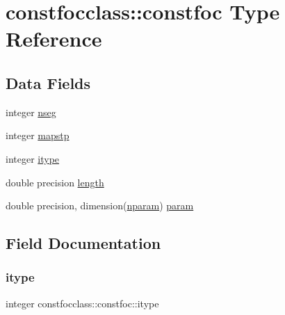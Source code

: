 \hypertarget{structconstfocclass_1_1constfoc}{}\section{constfocclass\+::constfoc Type Reference}
\label{structconstfocclass_1_1constfoc}
\subsection*{Data Fields}
\begin{DoxyCompactItemize}
\item 
integer \mbox{\hyperlink{structconstfocclass_1_1constfoc_ad5d129a88d9e84629813d001b6379bf5}{nseg}}
\item 
integer \mbox{\hyperlink{structconstfocclass_1_1constfoc_a7211bb49a75643cd5898f13851eb852e}{mapstp}}
\item 
integer \mbox{\hyperlink{structconstfocclass_1_1constfoc_a6805e237c322783df518e8f2c3e1feec}{itype}}
\item 
double precision \mbox{\hyperlink{structconstfocclass_1_1constfoc_a20a95ee3a0c6fd8f128d4fbe911077db}{length}}
\item 
double precision, dimension(\mbox{\hyperlink{namespaceconstfocclass_a4a04b85ebc26340b40e7c38cfad62bc1}{nparam}}) \mbox{\hyperlink{structconstfocclass_1_1constfoc_a91cddf45b9010e35e24ae6cd063a9ee7}{param}}
\end{DoxyCompactItemize}


\subsection{Field Documentation}
\mbox{\label{structconstfocclass_1_1constfoc_a6805e237c322783df518e8f2c3e1feec}} 
\subsubsection{\texorpdfstring{itype}{itype}}
{\footnotesize\ttfamily integer constfocclass\+::constfoc\+::itype}

\mbox{\label{structconstfocclass_1_1constfoc_a20a95ee3a0c6fd8f128d4fbe911077db}} 
